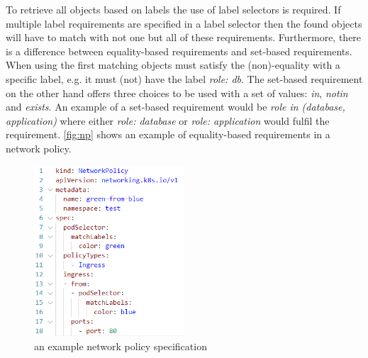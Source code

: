 To retrieve all objects based on labels the use of label selectors is required.  If multiple label requirements are specified in a label selector then the found objects will have to match with not one but all of these requirements. Furthermore, there is a difference between equality-based requirements and set-based requirements. When using the first matching objects must satisfy the (non)-equality with a specific label, e.g. it must (not) have the label \textit{role: db}. The set-based requirement on the other hand offers three choices to be used with a set of values: \textit{in}, \textit{notin} and \textit{exists}. An example of a set-based requirement would be \textit{role in (database, application)} where either \textit{role: database} or \textit{role: application} would fulfil the requirement. \autoref{fig:np} shows an example of equality-based requirements in a network policy. \cite{labels}
\\[10pt]

\begin{figure}[htbp]
  \centering
  \includegraphics[width=0.5\textwidth]{images/np.png} 
  \caption{an example network policy specification}
  \label{fig:np}
\end{figure}


